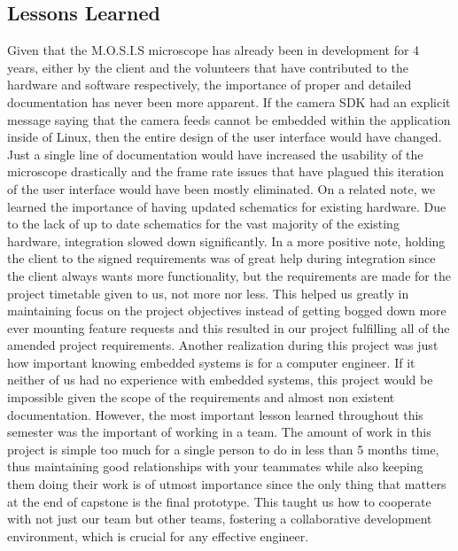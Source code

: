 \subsection{Lessons Learned}
Given that the M.O.S.I.S microscope has already been in development for 4 years, either by the client and the volunteers that have contributed to the hardware and software respectively, the importance of proper and detailed documentation has never been more apparent. If the camera SDK had an explicit message saying that the camera feeds cannot be embedded within the application inside of Linux, then the entire design of the user interface would have changed. Just a single line of documentation would have increased the usability of the microscope drastically and the frame rate issues that have plagued this iteration of the user interface would have been mostly eliminated. On a related note, we learned the importance of having updated schematics for existing hardware. Due to the lack of up to date schematics for the vast majority of the existing hardware, integration slowed down significantly. In a more positive note, holding the client to the signed requirements was of great help during integration since the client always wants more functionality, but the requirements are made for the project timetable given to us, not more nor less. This helped us greatly in maintaining focus on the project objectives instead of getting bogged down more ever mounting feature requests and this resulted in our project fulfilling all of the amended project requirements. Another realization during this project was just how important knowing embedded systems is for a computer engineer. If it neither of us had no experience with embedded systems, this project would be impossible given the scope of the requirements and almost non existent documentation. However, the most important lesson learned throughout this semester was the important of working in a team. The amount of work in this project is simple too much for a single person to do in less than 5 months time, thus maintaining good relationships with your teammates while also keeping them doing their work is of utmost importance since the only thing that matters at the end of capstone is the final prototype. This taught us how to cooperate with not just our team but other teams, fostering a collaborative development environment, which is crucial for any effective engineer.